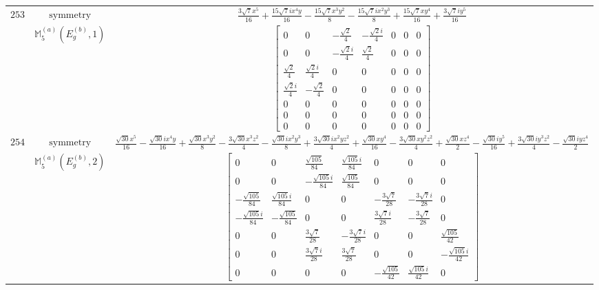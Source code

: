 \documentclass[fleqn,8pt,landscape]{jsarticle}
\begin{document}
\begin{longtable}{ccc}
$ 253 $ & $ \text{symmetry} $ & $ \frac{3 \sqrt{7} x^{5}}{16} + \frac{15 \sqrt{7} i x^{4} y}{16} - \frac{15 \sqrt{7} x^{3} y^{2}}{8} - \frac{15 \sqrt{7} i x^{2} y^{3}}{8} + \frac{15 \sqrt{7} x y^{4}}{16} + \frac{3 \sqrt{7} i y^{5}}{16} $ \\
$  $ & $ \mathbb{M}_{5}^{(a)}(E_{g}^{(b)},1) $ & $ \begin{bmatrix} 0 & 0 & - \frac{\sqrt{2}}{4} & - \frac{\sqrt{2} i}{4} & 0 & 0 & 0 \\ 0 & 0 & - \frac{\sqrt{2} i}{4} & \frac{\sqrt{2}}{4} & 0 & 0 & 0 \\ \frac{\sqrt{2}}{4} & \frac{\sqrt{2} i}{4} & 0 & 0 & 0 & 0 & 0 \\ \frac{\sqrt{2} i}{4} & - \frac{\sqrt{2}}{4} & 0 & 0 & 0 & 0 & 0 \\ 0 & 0 & 0 & 0 & 0 & 0 & 0 \\ 0 & 0 & 0 & 0 & 0 & 0 & 0 \\ 0 & 0 & 0 & 0 & 0 & 0 & 0 \end{bmatrix} $ \\ \hline
$ 254 $ & $ \text{symmetry} $ & $ \frac{\sqrt{30} x^{5}}{16} - \frac{\sqrt{30} i x^{4} y}{16} + \frac{\sqrt{30} x^{3} y^{2}}{8} - \frac{3 \sqrt{30} x^{3} z^{2}}{4} - \frac{\sqrt{30} i x^{2} y^{3}}{8} + \frac{3 \sqrt{30} i x^{2} y z^{2}}{4} + \frac{\sqrt{30} x y^{4}}{16} - \frac{3 \sqrt{30} x y^{2} z^{2}}{4} + \frac{\sqrt{30} x z^{4}}{2} - \frac{\sqrt{30} i y^{5}}{16} + \frac{3 \sqrt{30} i y^{3} z^{2}}{4} - \frac{\sqrt{30} i y z^{4}}{2} $ \\
$  $ & $ \mathbb{M}_{5}^{(a)}(E_{g}^{(b)},2) $ & $ \begin{bmatrix} 0 & 0 & \frac{\sqrt{105}}{84} & \frac{\sqrt{105} i}{84} & 0 & 0 & 0 \\ 0 & 0 & - \frac{\sqrt{105} i}{84} & \frac{\sqrt{105}}{84} & 0 & 0 & 0 \\ - \frac{\sqrt{105}}{84} & \frac{\sqrt{105} i}{84} & 0 & 0 & - \frac{3 \sqrt{7}}{28} & - \frac{3 \sqrt{7} i}{28} & 0 \\ - \frac{\sqrt{105} i}{84} & - \frac{\sqrt{105}}{84} & 0 & 0 & \frac{3 \sqrt{7} i}{28} & - \frac{3 \sqrt{7}}{28} & 0 \\ 0 & 0 & \frac{3 \sqrt{7}}{28} & - \frac{3 \sqrt{7} i}{28} & 0 & 0 & \frac{\sqrt{105}}{42} \\ 0 & 0 & \frac{3 \sqrt{7} i}{28} & \frac{3 \sqrt{7}}{28} & 0 & 0 & - \frac{\sqrt{105} i}{42} \\ 0 & 0 & 0 & 0 & - \frac{\sqrt{105}}{42} & \frac{\sqrt{105} i}{42} & 0 \end{bmatrix} $ \\ \hline

\end{longtable}
\end{document}
